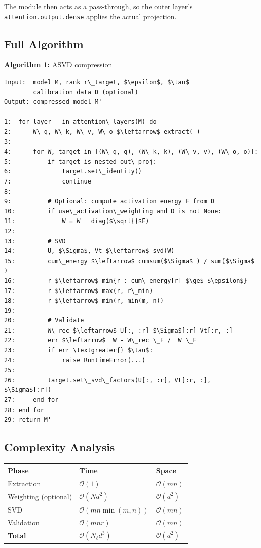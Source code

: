 The module then acts as a pass-through, so the outer layer's 
\texttt{attention.output.dense} applies the actual projection.

\subsection{Full Algorithm}

\textbf{Algorithm 1:} ASVD compression
\begin{lstlisting}
Input:  model M, rank r\_target, $\epsilon$, $\tau$
        calibration data D (optional)
Output: compressed model M'

1:  for layer   in attention\_layers(M) do
2:      W\_q, W\_k, W\_v, W\_o $\leftarrow$ extract( )
3:
4:      for W, target in [(W\_q, q), (W\_k, k), (W\_v, v), (W\_o, o)]:
5:          if target is nested out\_proj:
6:              target.set\_identity()
7:              continue
8:
9:          # Optional: compute activation energy F from D
10:         if use\_activation\_weighting and D is not None:
11:             W = W   diag($\sqrt{}$F)
12:
13:         # SVD
14:         U, $\Sigma$, Vt $\leftarrow$ svd(W)
15:         cum\_energy $\leftarrow$ cumsum($\Sigma$ ) / sum($\Sigma$ )
16:         r $\leftarrow$ min{r : cum\_energy[r] $\ge$ $\epsilon$}
17:         r $\leftarrow$ max(r, r\_min)
18:         r $\leftarrow$ min(r, min(m, n))
19:
20:         # Validate
21:         W\_rec $\leftarrow$ U[:, :r] $\Sigma$[:r] Vt[:r, :]
22:         err $\leftarrow$  W - W\_rec \_F /  W \_F
23:         if err \textgreater{} $\tau$:
24:             raise RuntimeError(...)
25:
26:         target.set\_svd\_factors(U[:, :r], Vt[:r, :], $\Sigma$[:r])
27:     end for
28: end for
29: return M'
\end{lstlisting}

\subsection{Complexity Analysis}

\begin{table}[H]
\centering
\small
\begin{tabular}{lll}
\toprule
\textbf{Phase} & \textbf{Time} & \textbf{Space} \\
\midrule
Extraction & $\mathcal{O}(1)$ & $\mathcal{O}(m n)$ \\
Weighting (optional) & $\mathcal{O}(N d^2)$ & $\mathcal{O}(d^2)$ \\
SVD & $\mathcal{O}(m n \min(m, n))$ & $\mathcal{O}(m n)$ \\
Validation & $\mathcal{O}(m n r)$ & $\mathcal{O}(m n)$ \\
\textbf{Total} & $\mathcal{O}(N_\ell d^3)$ & $\mathcal{O}(d^2)$ \\
\bottomrule
\end{tabular}
\end{table}

